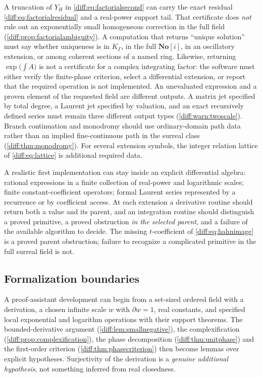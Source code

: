\documentclass[11pt,letterpaper]{article}
\numberwithin{equation}{section}
\theoremstyle{definition}
\theoremstyle{remark}
\newcommand{\SC}{\mathbf{No}[i]}
\newcommand{\der}{\partial}
\begin{document}
\begin{warning}
\label{diff:warn:truncationtype}
A truncation of $Y_{H}$ in \cref{diff:eq:factorialsecond} can carry the exact
residual \cref{diff:eq:factorialresidual} and a real-power support tail. That
certificate does \emph{not} rule out an exponentially small homogeneous
correction in the full field (\cref{diff:prop:factorialambiguity}). A
computation that returns ``unique solution'' must say whether uniqueness is in
$K_{\Gamma}$, in the full $\SC$, in an oscillatory extension, or among
coherent sections of a named ring. Likewise, returning
$\exp\bigl(\int A\bigr)$ is not a certificate for a complex integrating
factor: the software must either verify the finite-phase criterion, select a
differential extension, or report that the required operation is not
implemented. An unevaluated expression and a proven element of the requested
field are different outputs. A matrix jet specified by total degree, a Laurent
jet specified by valuation, and an exact recursively defined series must remain
three different output types
(\cref{diff:warn:twoscale}). Branch continuation and monodromy should use
ordinary-domain path data rather than an implied fine-continuous path in the
surreal class (\cref{diff:thm:monodromy}). For several extension symbols, the
integer relation lattice of \cref{diff:eq:lattice} is additional required data.
\end{warning}

A realistic first implementation can stay inside an explicit differential
algebra: rational expressions in a finite collection of real-power and
logarithmic scales; finite constant-coefficient operators; formal Laurent
series represented by a recurrence or by coefficient access. At each extension
a derivative routine should return both a value and its parent, and an
integration routine should distinguish a proved primitive, a proved
obstruction \emph{in the selected parent}, and a failure of the available
algorithm to decide. The missing $t$-coefficient of
\cref{diff:eq:hahnimage} is a proved parent obstruction; failure to recognize
a complicated primitive in the full surreal field is not.

\subsection{Formalization boundaries}
\label{diff:sub:formalization}

A proof-assistant development can begin from a set-sized ordered field with a
derivation, a chosen infinite scale $w$ with $\der w=1$, real constants, and
specified local exponential and logarithm operations with their support
theorems. The bounded-derivative argument
(\cref{diff:lem:smallnegative}), the complexification
(\cref{diff:prop:complexification}), the phase decomposition
(\cref{diff:thm:unitphase}) and the first-order criterion
(\cref{diff:thm:phasecriterion}) then become lemmas over explicit hypotheses.
Surjectivity of the derivation is a \emph{genuine additional hypothesis}, not
something inferred from real closedness.
\end{document}

